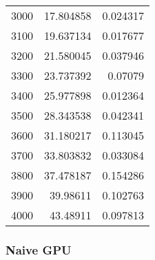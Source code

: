 \begin{tabular}{r r r}
3000 & 17.804858 & 0.024317 \\
3100 & 19.637134 & 0.017677 \\
3200 & 21.580045 & 0.037946 \\
3300 & 23.737392 & 0.07079 \\
3400 & 25.977898 & 0.012364 \\
3500 & 28.343538 & 0.042341 \\
3600 & 31.180217 & 0.113045 \\
3700 & 33.803832 & 0.033084 \\
3800 & 37.478187 & 0.154286 \\
3900 & 39.98611 & 0.102763 \\
4000 & 43.48911 & 0.097813 \\
\end{tabular}

\subsubsection{Naive GPU}

